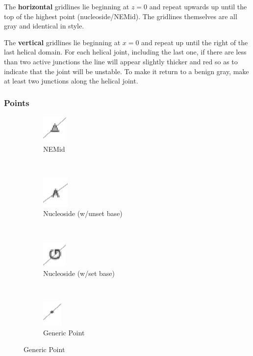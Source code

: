 \documentclass[titlepage]{article}
\begin{document}
The \textbf{horizontal} gridlines lie beginning at $z=0$ and repeat upwards up until the top of the highest point (nucleoside/NEMid). The gridlines themselves are all gray and identical in style.

The \textbf{vertical} gridlines lie beginning at $x=0$ and repeat up until the right of the last helical domain. For each helical joint, including the last one, if there are less than two active junctions the line will appear slightly thicker and red so as to indicate that the joint will be unstable. To make it return to a benign gray, make at least two junctions along the helical joint.

\subsubsection{Points}

\begin{figure}[h] \label{fig:side-view-plot-point-graphics}
	\centering
	\caption{Side View Plot Point Graphics}
	
	\begin{subfigure}{.22\linewidth} \label{fig:up-triangle}
		\centering
		\includegraphics[width=.32in]{up-triangle.png}
		\caption{NEMid}
	\end{subfigure}%
	~
	\begin{subfigure}{.28\linewidth} \label{fig:up-chevron}
		\centering
		\includegraphics[width=.34in]{up-chevron.png}
		\caption{Nucleoside (w/unset base)}
	\end{subfigure}%
	~
	\begin{subfigure}{.28\linewidth} \label{fig:base-symbol}
		\centering
		\includegraphics[width=.34in]{base-symbol.png}
		\caption{Nucleoside (w/set base)}
	\end{subfigure}%
	~
	\begin{subfigure}{.22\linewidth} \label{fig:nondominant-point}
		\centering
		\includegraphics[width=.32in]{nondominant-point.png}
		\caption{Generic Point}
	\end{subfigure}
\end{figure}
\end{document}
